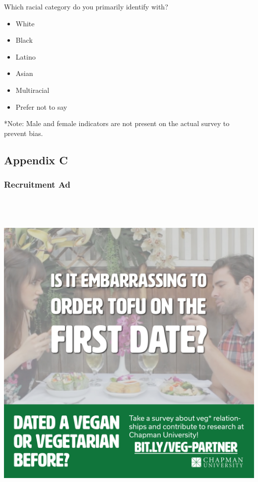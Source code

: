 \begin{multicols}{2}
 Which racial category do you primarily identify with?

 \begin{itemize}
  \item
        White
 \end{itemize}

 \begin{itemize}
  \item
        Black
  \item
        Latino
  \item
        Asian
  \item
        Multiracial
  \item
        Prefer not to say
 \end{itemize}

 *Note: Male and female indicators are not present on the actual survey to prevent bias.

\end{multicols}
\hypertarget{appendix-c}{\subsection{Appendix C}}

\hypertarget{recruitment-ad}{%
 \subsubsection{Recruitment Ad}\label{recruitment-ad}}

\includegraphics[width=6.5in,height=6.5in]{images/soyboys.jpg}
